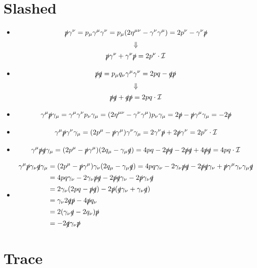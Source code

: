 \documentclass{report}
\begin{document}
\section{Slashed}
\begin{itemize}
    \item $$ \slashed{p}\gamma^\nu = p_\mu\gamma^\mu\gamma^\nu = p_\mu(2\eta^{\mu\nu} - \gamma^\nu\gamma^\mu) = 2p^\nu - \gamma^\nu\slashed{p} $$
	    $$ \Downarrow $$
	  $$ \slashed{p}\gamma^\nu + \gamma^\nu\slashed{p} = 2p^\nu \cdot \mathcal{I}$$

    \item $$ \slashed{p}\slashed{q} = p_\mu q_\nu \gamma^\mu\gamma^\nu = 2pq - \slashed{q}\slashed{p} $$
	    $$ \Downarrow $$
	  $$ \slashed{p}\slashed{q} + \slashed{q}\slashed{p} = 2pq\cdot \mathcal{I} $$

    \item $$ \gamma^\mu\slashed{p}\gamma_\mu = \gamma^\mu\gamma^\nu p_\nu\gamma_\mu = (2\eta^{\mu\nu} - \gamma^\nu\gamma^\mu)p_\nu \gamma_\mu = 2\slashed{p} - \slashed{p}\gamma^\mu\gamma_\mu = -2\slashed{p} $$

    \item $$ \gamma^\mu\slashed{p}\gamma^\nu\gamma_\mu = (2p^\mu - \slashed{p}\gamma^\mu)\gamma^\nu\gamma_\mu = 2\gamma^\nu\slashed{p} + 2\slashed{p}\gamma^\nu = 2p^\nu \cdot \mathcal{I} $$

    \item $$ \gamma^\mu\slashed{p}\slashed{q}\gamma_\mu = (2p^\mu - \slashed{p}\gamma^\mu)(2q_\mu - \gamma_\mu\slashed{q}) = 4pq - 2\slashed{p}\slashed{q} - 2\slashed{p}\slashed{q} + 4\slashed{p}\slashed{q} = 4pq\cdot \mathcal{I} $$

    \item 
	\begin{equation*}
	    \begin{aligned}
		\gammaMu\slashed{p}\gammanu\slashed{q}\gammamu &= (2p^\mu - \slashed{p}\gammaMu)\gammanu(2q_\mu - \gammamu\slashed{q}) = 4pq\gammanu - 2\gammanu\slashed{p}\slashed{q} - 2\slashed{p}\slashed{q}\gammanu + \slashed{p}\gammaMu\gammanu\gammamu\slashed{q}   \\%
		&= 4pq\gammanu - 2\gammanu\slashed{p}\slashed{q} - 2\slashed{p}\slashed{q}\gammanu - 2\slashed{p}\gammanu\slashed{q}	\\%
		&= 2\gammanu(2pq - \slashed{p}\slashed{q}) - 2\slashed{p}(\slashed{q}\gammanu + \gammanu\slashed{q})	\\%
		&= \gammanu 2\slashed{q}\slashed{p} - 4\slashed{p} q_\nu	\\%
		&= 2(\gammanu\slashed{q} - 2q_\nu)\slashed{p}	\\%
		&= -2\slashed{q}\gammanu\slashed{p}    \\%
	    \end{aligned}
	\end{equation*}
\end{itemize}


\section{Trace}
\end{document}

